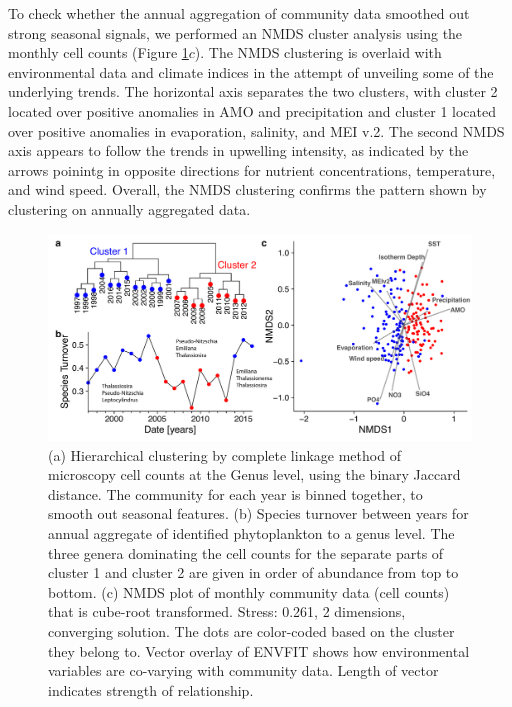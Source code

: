 \documentclass[draft]{agujournal2019}
\begin{document}
To check whether the annual aggregation of community data smoothed out strong seasonal signals, we performed an NMDS cluster analysis using the monthly cell counts (Figure \ref{fig:clustering}$c$). The NMDS clustering is overlaid with environmental data and climate indices in the attempt of unveiling some of the underlying trends. The horizontal axis separates the two clusters, with cluster 2 located over positive anomalies in AMO and precipitation and cluster 1 located over positive anomalies in evaporation, salinity, and MEI v.2. The second NMDS axis appears to follow the trends in upwelling intensity, as indicated by the arrows poinintg in opposite directions for nutrient concentrations, temperature, and wind speed. Overall, the NMDS clustering confirms the pattern shown by clustering on annually aggregated data. 

\begin{figure}
\noindent\includegraphics[width=\textwidth]{fig/Figure4_ClusteringNMDS_v2.pdf}
\caption{(a) Hierarchical clustering by complete linkage method of microscopy cell counts at the Genus level, using the binary Jaccard distance. The community for each year is binned together, to smooth out seasonal features. (b) Species turnover between years for annual aggregate of identified phytoplankton to a genus level. The three genera dominating the cell counts for the separate parts of cluster 1 and cluster 2 are given in order of abundance from top to bottom. (c) NMDS plot of monthly community data (cell counts) that is cube-root transformed. Stress: 0.261, 2 dimensions, converging solution. The dots are color-coded based on the cluster they belong to. Vector overlay of ENVFIT shows how environmental variables are co-varying with community data. Length of vector indicates strength of relationship.}
\label{fig:clustering}
\end{figure}
\end{document}
